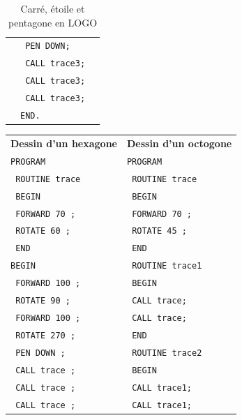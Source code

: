 \begin{table}[t]
\begin{tabular}{l|l|l}
                                &  \texttt{  PEN DOWN;}          & \\
                                &  \texttt{  CALL trace3;}       & \\
                                &  \texttt{  CALL trace3;}       & \\
                                &  \texttt{  CALL trace3;}       & \\
                                &  \texttt{END.}                 & \\
  \end{tabular}
  \caption{Carré, étoile et pentagone en LOGO}
\end{table}



\begin{table}[t]
  \centering
  \small
  \begin{tabular}{l|l}
  \textbf{Dessin d'un hexagone} &  \textbf{Dessin d'un octogone} \\
  \texttt{PROGRAM}              &  \texttt{PROGRAM}              \\
  \texttt{  ROUTINE trace}      &  \texttt{  ROUTINE trace}      \\
  \texttt{  BEGIN}              &  \texttt{  BEGIN}              \\
  \texttt{    FORWARD 70 ;}     &  \texttt{    FORWARD 70 ;}     \\
  \texttt{    ROTATE 60 ;}      &  \texttt{    ROTATE 45 ;}      \\
  \texttt{  END}                &  \texttt{  END}                \\
  \texttt{BEGIN}                &  \texttt{  ROUTINE trace1}     \\
  \texttt{  FORWARD 100 ;}      &  \texttt{  BEGIN}              \\
  \texttt{  ROTATE 90 ;}        &  \texttt{    CALL trace;}      \\
  \texttt{  FORWARD 100 ;}      &  \texttt{    CALL trace;}      \\
  \texttt{  ROTATE 270 ;}       &  \texttt{  END}                \\
  \texttt{  PEN DOWN ;}         &  \texttt{  ROUTINE trace2}     \\
  \texttt{  CALL trace ;}       &  \texttt{  BEGIN}              \\
  \texttt{  CALL trace ;}       &  \texttt{    CALL trace1;}     \\
  \texttt{  CALL trace ;}       &  \texttt{    CALL trace1;}     \\

\end{tabular}
\end{table}
